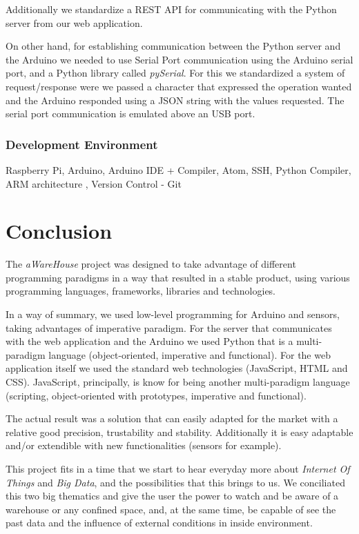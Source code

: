 \documentclass[12pt]{report}
\begin{document}
Additionally we standardize a REST API for communicating with the Python server from our web application.

On other hand, for establishing communication between the Python server and the Arduino we needed to use Serial Port communication using the Arduino serial port\cite{serial}, and a Python library called \textit{pySerial}\cite{pyserial}. For this we standardized a system of request/response were we passed a character that expressed the operation wanted and the Arduino responded using a JSON string with the values requested. The serial port communication is emulated above an USB port.



\subsection{Development Environment}

Raspberry Pi, Arduino, Arduino IDE  + Compiler, Atom, SSH, Python Compiler, ARM architecture , Version Control - Git

\newpage
\chapter{Conclusion}

The \textit{aWareHouse} project was designed to take advantage of different programming paradigms in a way that resulted in a stable product, using various programming languages, frameworks, libraries and technologies. 

In a way of summary, we used low-level programming for Arduino and sensors, taking advantages of imperative paradigm. For the server that communicates with the web application and the Arduino we used Python that is a multi-paradigm language (object-oriented, imperative and functional). For the web application itself we used the standard web technologies (JavaScript, HTML and CSS). JavaScript, principally, is know for being another multi-paradigm language (scripting, object-oriented with prototypes, imperative and functional).

The actual result was a solution that can easily adapted for the market with a relative good precision, trustability and stability. Additionally it is easy adaptable and/or extendible with new functionalities (sensors for example).

This project fits in a time that we start to hear everyday more about \textit{Internet Of Things} and \textit{Big Data}, and the possibilities that this brings to us. We conciliated this two big thematics and give the user the power to watch and be aware of a warehouse or any confined space, and, at the same time, be capable of see the past data and the influence of external conditions in inside environment.
\end{document}
